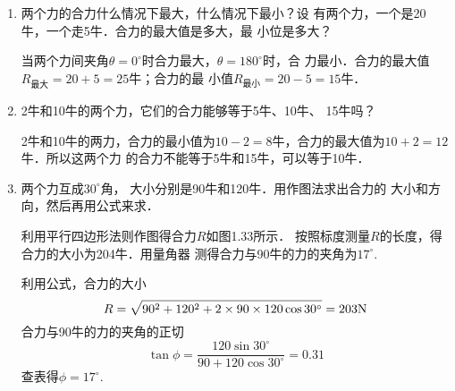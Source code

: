 \begin{enumerate}
\begin{solution}
\end{solution}
\item 两个力的合力什么情况下最大，什么情况下最小？设
有两个力，一个是20牛，一个走5牛．合力的最大值是多大，最
小位是多大？

\begin{solution}
    当两个力间夹角$\theta=0^{\circ}$时合力最大，$\theta=180^{\circ}$时，合
力最小．合力的最大值$R_{\text{最大}}=20+5=25$牛；合力的最
小值$R_{\text{最小}}=20-5=15$牛．
\end{solution}
\item 2牛和10牛的两个力，它们的合力能够等于5牛、10牛、
15牛吗？

\begin{solution}
    2牛和10牛的两力，合力的最小值为$10-2=8$牛，合力的最大值为$10+2=12$牛．所以这两个力
的合力不能等于5牛和15牛，可以等于10牛．
\end{solution}
\item   两个力互成$30^\circ$角， 大小分别是90牛和120牛．用作图法求出合力的
大小和方向，然后再用公式来求．

\begin{figure}[htp]
    \centering
{}
    \caption{}
\end{figure}


\begin{solution}
    利用平行四边形法则作图得合力$R$如图1.33所示．
按照标度测量$R$的长度，得合力的大小为204牛．用量角器
测得合力与90牛的力的夹角为$17^{\circ}$.

利用公式，合力的大小
\[R=\sqrt{90^2+120^2+2\times90\times120\cos30^{\circ}}=203{\rm N}\]
合力与90牛的力的夹角的正切
\[\tan\phi = \frac{120\sin 30^{\circ}}{90+120\cos30^{\circ}}=
0.31\]
查表得$\phi=17^{\circ}$.
\end{solution}
\end{enumerate}


